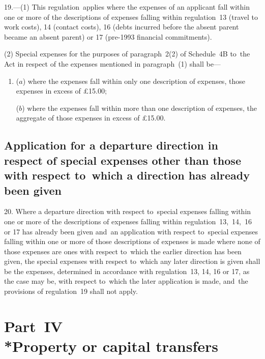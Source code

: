 \documentclass[12pt,a4paper]{article}
\begin{document}
19.—(1)
This regulation~applies where the expenses of an applicant fall within one or
more of the descriptions of expenses falling within regulation~13 (travel to
work costs), 14 (contact costs), 16 (debts incurred before the absent parent
became an absent parent) or 17 (pre-1993 financial commitments).

(2) Special expenses for the purposes of paragraph~2(2) of Schedule~4B to~the
Act in respect of the expenses mentioned in paragraph~(1) shall be—
\begin{enumerate}\item[]
($a$) where the expenses fall within only one description of expenses, those
expenses in excess of £15.00;

($b$) where the expenses fall within more than one description of expenses, the
aggregate of those expenses in excess of £15.00.
\end{enumerate}

\subsection[20. Application for a departure direction in respect of special expenses other than
those with respect to~which a direction has already been given]{Application for a departure direction in respect of special expenses other than
those with respect to~which a direction has already been given}

20. Where a
departure direction with respect to~special expenses falling within one or more
of the descriptions of expenses falling within regulation~13,~14,~16 or 17 has
already been given and~an application with respect to~special expenses falling
within one or more of those descriptions of expenses is made where none of those
expenses are ones with respect to~which the earlier direction has been given,
the special expenses with respect to~which any later direction is given shall be
the expenses, determined in accordance with regulation~13, 14, 16 or 17, as the
case may be, with respect to~which the later application is made, and~the
provisions of regulation~19 shall not apply.

\section[Part~IV --- Property or capital transfers]{Part~IV\\*Property or capital transfers}

\renewcommand\parthead{--- Part~IV}
\end{document}
